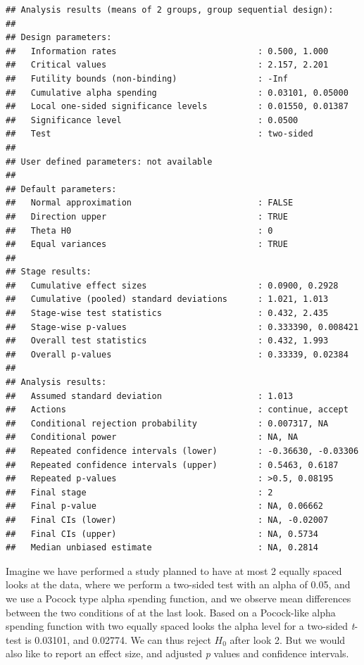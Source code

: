 \documentclass[
  oneside]{book}
\begin{document}
\begin{verbatim}
## Analysis results (means of 2 groups, group sequential design):
## 
## Design parameters:
##   Information rates                            : 0.500, 1.000 
##   Critical values                              : 2.157, 2.201 
##   Futility bounds (non-binding)                : -Inf 
##   Cumulative alpha spending                    : 0.03101, 0.05000 
##   Local one-sided significance levels          : 0.01550, 0.01387 
##   Significance level                           : 0.0500 
##   Test                                         : two-sided 
## 
## User defined parameters: not available
## 
## Default parameters:
##   Normal approximation                         : FALSE 
##   Direction upper                              : TRUE 
##   Theta H0                                     : 0 
##   Equal variances                              : TRUE 
## 
## Stage results:
##   Cumulative effect sizes                      : 0.0900, 0.2928 
##   Cumulative (pooled) standard deviations      : 1.021, 1.013 
##   Stage-wise test statistics                   : 0.432, 2.435 
##   Stage-wise p-values                          : 0.333390, 0.008421 
##   Overall test statistics                      : 0.432, 1.993 
##   Overall p-values                             : 0.33339, 0.02384 
## 
## Analysis results:
##   Assumed standard deviation                   : 1.013 
##   Actions                                      : continue, accept 
##   Conditional rejection probability            : 0.007317, NA 
##   Conditional power                            : NA, NA 
##   Repeated confidence intervals (lower)        : -0.36630, -0.03306 
##   Repeated confidence intervals (upper)        : 0.5463, 0.6187 
##   Repeated p-values                            : >0.5, 0.08195 
##   Final stage                                  : 2 
##   Final p-value                                : NA, 0.06662 
##   Final CIs (lower)                            : NA, -0.02007 
##   Final CIs (upper)                            : NA, 0.5734 
##   Median unbiased estimate                     : NA, 0.2814
\end{verbatim}

Imagine we have performed a study planned to have at most 2 equally spaced looks at the data, where we perform a two-sided test with an alpha of 0.05, and we use a Pocock type alpha spending function, and we observe mean differences between the two conditions of at the last look. Based on a Pocock-like alpha spending function with two equally spaced looks the alpha level for a two-sided \emph{t}-test is 0.03101, and 0.02774. We can thus reject \(H_0\) after look 2. But we would also like to report an effect size, and adjusted \emph{p} values and confidence intervals.
\end{document}
